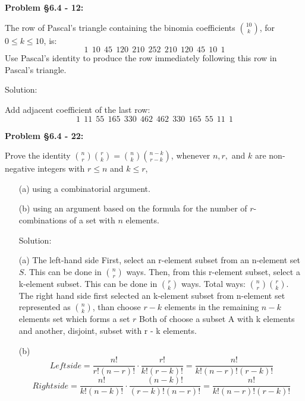 \documentclass{article}
\newenvironment{problem}[1]
{\begin{mdframed}[default]
\textbf{Problem #1:}
}
{\end{mdframed}
}
\begin{document}
\begin{problem}{\S 6.4 - 12}
The row of Pascal's triangle containing the binomia coefficients ${ 10 \choose k}$,
for $0 \leq k \leq 10$, is:
\[1~~10~~45~~120~~210~~252~~210~~120~~45~~10~~1 \]
Use Pascal's identity to produce the row immediately following this row in Pascal's
triangle.

Solution:

Add adjacent coefficient of the last row:
\[1~~11~~55~~165~~330~~462~~462~~330~~165~~55~~11~~1\]
\end{problem}
\begin{problem}{\S 6.4 - 22}
Prove the identity ${n \choose r}{r \choose k} = {n \choose k}{n-k \choose r-k}$,
whenever $n, r,$ and $k$ are non-negative integers with $r \leq n$ and $k \leq r$,
\begin{enumerate}
\item[(a)] using a combinatorial argument.
\item[(b)] using an argument based on the formula for the number of $r$-
combinations of a set with $n$ elements.

Solution:

(a) The left-hand side First, select an r-element subset from an n-element set $S$. This can be done in ${n \choose r}$ ways.
Then, from this r-element subset, select a k-element subset. This can be done in 
${r \choose k}$ ways.
Total ways: ${n \choose r}{r \choose k}$.
The right hand side first selected an k-element subset from n-element set represented as ${n \choose k}$, than choose $r-k$ elements in the remaining $n-k$ elements set which forms a set $r$
Both of choose a subset A with k elements and another, disjoint, subset with r - k elements.


(b)\[Left side = \frac{n!}{r!(n-r)!}\cdot\frac{r!}{k!(r-k)!}=\frac{n!}{k!(n-r)!(r-k)!}\]
\[Right side = \frac{n!}{k!(n-k)!}\cdot\frac{(n-k)!}{(r-k)!(n-r)!}=\frac{n!}{k!(n-r)!(r-k)!}\]

\end{enumerate}
\end{problem}
\end{document}
